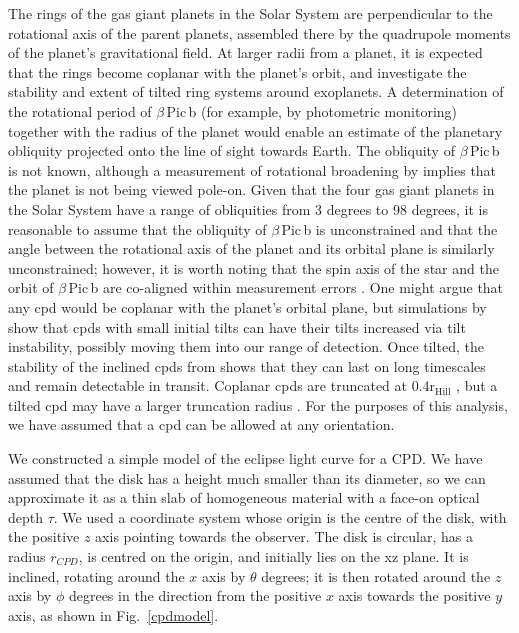\documentclass[longauth]{aa} %
\newcommand{\rhill}{$\mathrm{r_{Hill}}$} %
\newcommand{\bpb}{$\beta$\,Pic\,b}
\begin{document}
The rings of the gas giant planets in the Solar System are perpendicular to the rotational axis of the parent planets, assembled there by the quadrupole moments of the planet's gravitational field.
%
At larger radii from a planet, it is expected that the rings become coplanar with the planet's orbit, and \citet{Speedie20} investigate the stability and extent of tilted ring systems around exoplanets.
%
A determination of the rotational period of \bpb{} (for example, by photometric monitoring) together with the radius of the planet would enable an estimate of the planetary obliquity projected onto the line of sight towards Earth.
%
The obliquity of \bpb{} is not known, although a measurement of rotational broadening by \citet{Snellen14} implies that the planet is not being viewed pole-on.
%
Given that the four gas giant planets in the Solar System have a range of obliquities from 3 degrees to 98 degrees, it is reasonable to assume that the obliquity of \bpb{} is unconstrained and that the angle between the rotational axis of the planet and its orbital plane is similarly unconstrained; however, it is worth noting that the spin axis of the star and the orbit of \bpb{} are co-aligned within measurement errors \citep{Kraus20}.
%
One might argue that any \ac{cpd} would be coplanar with the planet's orbital plane, but simulations by \citet{Martin20} show that \ac{cpd}s with small initial tilts can have their tilts increased via tilt instability, possibly moving them into our range of detection.
%
Once tilted, the stability of the inclined \ac{cpd}s from \citet{Speedie20} shows that they can last on long timescales and remain detectable in transit.
%
Coplanar \ac{cpd}s are truncated at 0.4\rhill{} \citep{Martin11}, but a tilted \ac{cpd} may have a larger truncation radius \citep{Lubow15,Miranda15}.
%
For the purposes of this analysis, we have assumed that a \ac{cpd} can be allowed at any orientation.

We constructed a simple model of the eclipse light curve for a CPD.
%
We have assumed that the disk has a height much smaller than its diameter, so we can approximate it as a thin slab of homogeneous material with a face-on optical depth $\tau$.
%
We used a coordinate system whose origin is the centre of the disk, with the positive $z$ axis pointing towards the observer.
%
The disk is circular, has a radius $r_{CPD}$, is centred on the origin, and initially lies on the xz plane.
%
It is inclined, rotating around the $x$ axis by $\theta$ degrees; it is then rotated around the $z$ axis by $\phi$ degrees in the direction from the positive $x$ axis towards the positive $y$ axis, as shown in Fig.~\ref{cpdmodel}.
\end{document}
